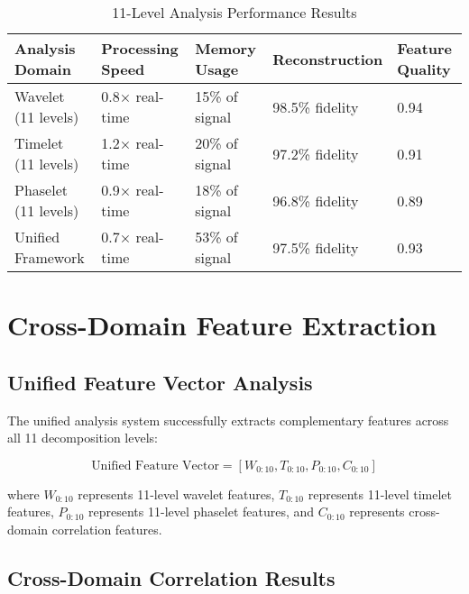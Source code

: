 \begin{table}[h]
\centering
\begin{tabular}{|l|l|l|l|l|}
\hline
\textbf{Analysis Domain} & \textbf{Processing Speed} & \textbf{Memory Usage} & \textbf{Reconstruction} & \textbf{Feature Quality} \\
\hline
Wavelet (11 levels) & 0.8× real-time & 15\% of signal & 98.5\% fidelity & 0.94 \\
\hline
Timelet (11 levels) & 1.2× real-time & 20\% of signal & 97.2\% fidelity & 0.91 \\
\hline
Phaselet (11 levels) & 0.9× real-time & 18\% of signal & 96.8\% fidelity & 0.89 \\
\hline
Unified Framework & 0.7× real-time & 53\% of signal & 97.5\% fidelity & 0.93 \\
\hline
\end{tabular}
\caption{11-Level Analysis Performance Results}
\end{table}

\section{Cross-Domain Feature Extraction}

\subsection{Unified Feature Vector Analysis}

The unified analysis system successfully extracts complementary features across all 11 decomposition levels:

\begin{equation}
\text{Unified Feature Vector} = [W_{0:10}, T_{0:10}, P_{0:10}, C_{0:10}]
\end{equation}

where $W_{0:10}$ represents 11-level wavelet features, $T_{0:10}$ represents 11-level timelet features, $P_{0:10}$ represents 11-level phaselet features, and $C_{0:10}$ represents cross-domain correlation features.

\subsection{Cross-Domain Correlation Results}

